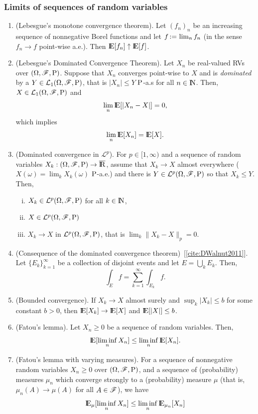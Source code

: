 \documentclass[a4paper,10pt]{scrbook}
\begin{document}
\subsubsection{Limits of sequences of random variables}
\begin{enumerate}
 \item (Lebesgue's monotone convergence theorem). Let $(f_n)_n$ be an increasing sequence of 
       nonnegative Borel functions and let $f {}\mathop{\mathrel{:}=}{} \lim_n f_n$ (in the sense $f_n\to f$ point-wise a.e.). 
       Then $\E[f_n] \uparrow \E[f]$.
      
 \item 	(Lebesgue's Dominated Convergence Theorem). Let $X_n$ be real-valued RVs over $(\Omega,\mathscr{F},\mathrm{P})$. 
	Suppose that $X_n$ converges point-wise to $X$ and is \textit{dominated} by a 
	$Y\in\mathcal{L}_1(\Omega,\mathscr{F},\mathrm{P})$, that is $|X_n|\leq Y$ $\mathrm{P}$-a.s for all $n\in\N$. 
	Then, $X\in\mathcal{L}_1(\Omega,\mathscr{F},\mathrm{P})$
	and
	\[
	 \lim_n \E[|X_n-X|] = 0,
	\]
        which implies
        \[
         \lim_n \E[X_n] = \E[X].
        \]

 \item (Dominated convergence in $\mathcal{L}^p$).
       For $p\in[1,\infty)$ and a sequence of random variables $X_k:\ofp\to\barre$,
       assume that $X_k\to X$ almost everywhere ($X(\omega)=\lim_k X_k(\omega)$ $\mathrm{P}$-a.e.)
       and there is $Y\in\mathcal{L}^p(\Omega,\mathscr{F},\mathrm{P})$ so that $X_k\leq Y$. Then, 
       \begin{enumerate}[i.]
        \item $X_k\in\mathcal{L}^p(\Omega,\mathscr{F},\mathrm{P})$ for all $k\in\N$,
        \item $X\in\mathcal{L}^p(\Omega,\mathscr{F},\mathrm{P})$ 
        \item $X_k\to X$ in $\mathcal{L}^p(\Omega,\mathscr{F},\mathrm{P})$, that is $\lim_k \|X_k-X\|_p = 0$.
       \end{enumerate}

 \item (Consequence of the dominated convergence theorem)~[\ref{cite:DWalnut2011}]. 
       Let $\{E_k\}_{k=1}^{\infty}$ be a collection of disjoint events and let $E=\bigcup_{k}E_k$.
       Then,
       \[
        \int_E f = \sum_{k=1}^{\infty} \int_{E_k} f.
       \]

 \item  (Bounded convergence). If $X_k \to X$ almost surely and $\sup_k |X_k| \leq b$
        for some constant $b>0$, then $\E[X_k]\to \E[X]$ and $\E[|X|] \leq b$.
       
 \item 	(Fatou's lemma). Let $X_n\geq 0$ be a sequence of random variables. 
	Then, 
	\[
	\E[\liminf_n X_n] \leq  \liminf_n \E[X_n].
	\]
 \item 	(Fatou's lemma with varying measures). For a sequence of nonnegative random variables $X_n\geq 0$ over $(\Omega,\mathscr{F},\mathrm{P})$,
	and a sequence of (probability) measures $\mu_n$ which converge strongly to a (probability)
	measure $\mu$ (that is, $\mu_n(A)\to\mu(A)$ for all $A\in\mathscr{F}$), we have
	\[
	 \E_\mu[\liminf_n X_n]\leq \liminf_n \E_{\mu_n}[ X_n]
	\]


\end{enumerate}
\end{document}
